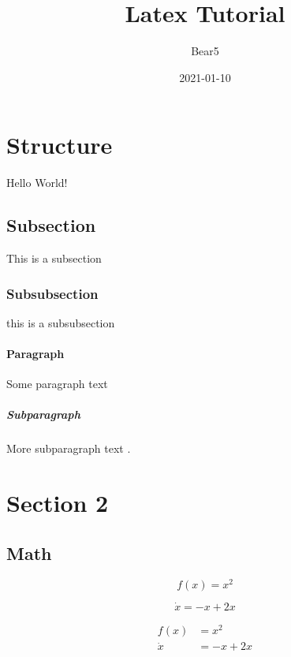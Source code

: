 \documentclass{article}
\title{Latex Tutorial}
\date{2021-01-10}
\author{Bear5}
\begin{document}

\maketitle
\newpage

\tableofcontents
\newpage

\doublespacing
\listoffigures
\singlespacing
\newpage

\listoftables
\newpage




\section{Structure}
Hello World!

\subsection{Subsection}
This is a subsection

\subsubsection{Subsubsection}
this is a subsubsection


\paragraph{Paragraph}
Some paragraph text

\subparagraph{Subparagraph}
More subparagraph text .

\newpage
\section{Section 2}


\subsection{Math}
\begin{equation}
    f(x) = x^2
\end{equation}

\begin{equation*}
    \dot{x}= -x + 2x
\end{equation*}

\begin{align*}
    f(x) &= x^2 \\
    \dot{x} &= -x + 2x
\end{align*}
\end{document}
